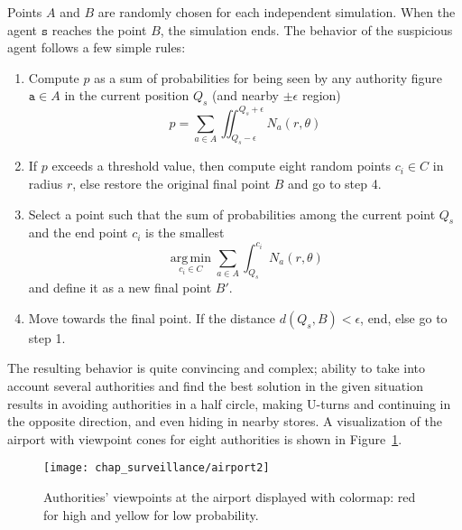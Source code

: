 Points $A$ and $B$ are randomly chosen for each independent simulation. When the agent $\mathtt{s}$ reaches the point $B$, the simulation ends. The behavior of the suspicious agent follows a few simple rules:
\begin{enumerate}
 	\item Compute $p$ as a sum of probabilities for being seen by any authority figure $\mathtt{a} \in A$ in the current position $Q_s$ (and nearby $\pm\epsilon$ region)
	\begin{equation}
		p = \sum_{a \in A} \iint_{Q_s-\epsilon}^{Q_s+\epsilon}N_a(r, \theta) 
	\end{equation}
	\item If $p$ exceeds a threshold value, then compute eight random points $c_i \in C$ in radius $r$, else restore the original final point $B$ and go to step 4.
	\item Select a point such that the sum of probabilities among the current point $Q_s$ and the end point $c_i$ is the smallest 
	\begin{equation*}
		\operatorname*{arg\,min}_{c_i \in C}\sum_{a \in A}\int_{Q_s}^{c_i}N_a(r, \theta)
	\end{equation*}
	and define it as a new final point $B'$.
	\item Move towards the final point. If the distance $d(Q_s, B) < \epsilon$, end, else go to step 1.
\end{enumerate}

The resulting behavior is quite convincing and complex; ability to take into account several authorities and find the best solution in the given situation results in avoiding authorities in a half circle, making U-turns and continuing in the opposite direction, and even hiding in nearby stores. A visualization of the airport with viewpoint cones for eight authorities is shown in Figure~\ref{fig:airport:authorities}.

\begin{figure}[!ht]
\centering
\texttt{[image: chap\_surveillance/airport2]}
\caption{Authorities' viewpoints at the airport displayed with colormap: red for high and yellow for low probability.}
\label{fig:airport:authorities}
\end{figure}